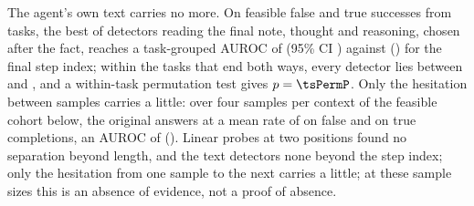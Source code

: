 The agent's own text carries no more. On \tsNFs{} feasible false and \tsNTrue{} true successes from \tsNTasks{} tasks, the best of \tsNModels{} detectors reading the final note, thought and reasoning, chosen after the fact, reaches a task-grouped AUROC of \tsBestAuc{} (95\% CI \tsBestCi) against \tsStepAuc{} (\tsStepCi) for the final step index; within the \tsMixed{} tasks that end both ways, every detector lies between \tsMixedMin{} and \tsMixedMax, and a within-task permutation test gives $p=\tsPermP$. Only the hesitation between samples carries a little: over four samples per context of the feasible cohort below, the original answers at a mean rate of \tsConsRateFs{} on false and \tsConsRateTrue{} on true completions, an AUROC of \tsConsAuc{} (\tsConsCi). Linear probes at two positions found no separation beyond length, and the text detectors none beyond the step index; only the hesitation from one sample to the next carries a little; at these sample sizes this is an absence of evidence, not a proof of absence. %

